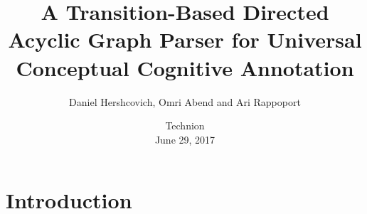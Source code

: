 \documentclass[t]{beamer}
\begin{document}
\title[A Transition-Based DAG Parser for UCCA]{A Transition-Based Directed Acyclic Graph Parser for Universal Conceptual Cognitive Annotation}
\author{Daniel Hershcovich, Omri Abend and Ari Rappoport}
\date{Technion \\ June 29, 2017}

\begin{frame}
\titlepage
\end{frame}



\section{Introduction}
\end{document}
